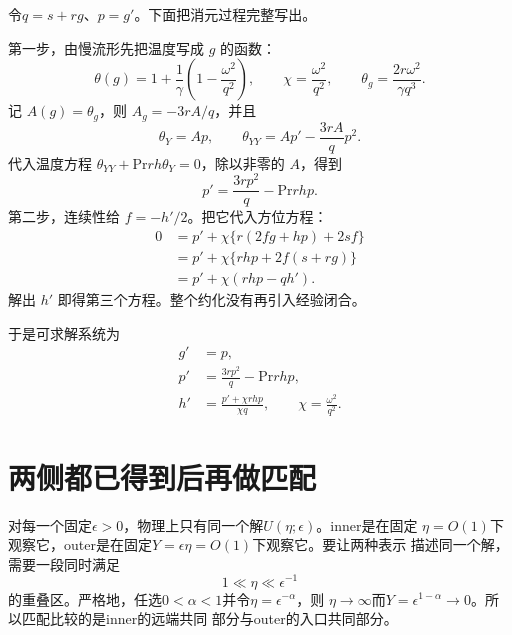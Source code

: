 \documentclass[UTF8,zihao=-4,openany]{ctexbook}
\newcommand{\eps}{\epsilon}
\newcommand{\Pran}{\mathrm{Pr}}
\begin{document}
令$q=s+rg$、$p=g'$。下面把消元过程完整写出。

\begin{derivationbox}
第一步，由慢流形先把温度写成 $g$ 的函数：
\begin{equation*}
 \theta(g)=1+\frac1\gamma\left(1-\frac{\omega^2}{q^2}\right),\qquad
 \chi=\frac{\omega^2}{q^2},\qquad
 \theta_g=\frac{2r\omega^2}{\gamma q^3}.
\end{equation*}
记 $A(g)=\theta_g$，则 $A_g=-3rA/q$，并且
\begin{equation*}
 \theta_Y=Ap,\qquad \theta_{YY}=A p'-\frac{3rA}{q}p^2.
\end{equation*}
代入温度方程 $\theta_{YY}+\Pran r h\theta_Y=0$，除以非零的 $A$，得到
\begin{equation*}
 p'=\frac{3rp^2}{q}-\Pran r hp.
\end{equation*}
第二步，连续性给 $f=-h'/2$。把它代入方位方程：
\begin{align*}
 0&=p'+\chi\{r(2fg+hp)+2sf\}\\
  &=p'+\chi\{rhp+2f(s+rg)\}\\
  &=p'+\chi(rhp-qh').
\end{align*}
解出 $h'$ 即得第三个方程。整个约化没有再引入经验闭合。
\end{derivationbox}

于是可求解系统为
\begin{subequations}\label{eq:outerreduced}
\begin{align}
 g'&=p,\\
 p'&=\frac{3rp^2}{q}-\Pran r hp,\\
 h'&=\frac{p'+\chi rhp}{\chi q},
 \qquad \chi=\frac{\omega^2}{q^2}.
\end{align}
\end{subequations}

\section{两侧都已得到后再做匹配}\label{sec:matching}

对每一个固定$\eps>0$，物理上只有同一个解$U(\eta;\eps)$。inner是在固定
$\eta=O(1)$下观察它，outer是在固定$Y=\eps\eta=O(1)$下观察它。要让两种表示
描述同一个解，需要一段同时满足
\begin{equation}\label{eq:overlap}
 1\ll\eta\ll\eps^{-1}
\end{equation}
的重叠区。严格地，任选$0<\alpha<1$并令$\eta=\eps^{-\alpha}$，则
$\eta\to\infty$而$Y=\eps^{1-\alpha}\to0$。所以匹配比较的是inner的远端共同
部分与outer的入口共同部分。
\end{document}
